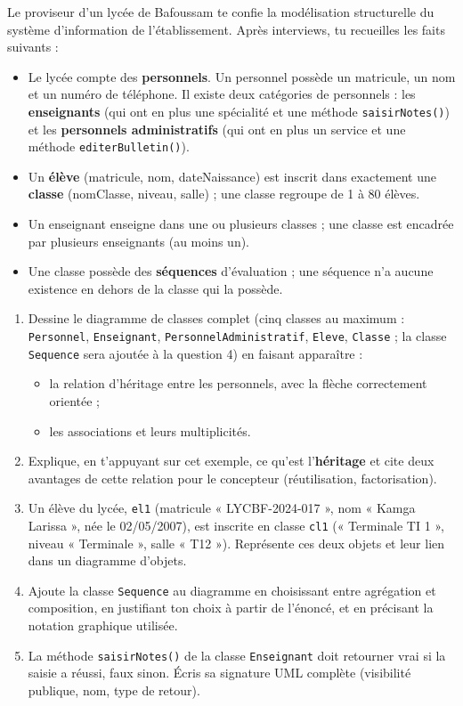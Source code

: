 \documentclass[11pt]{article}
\begin{document}
\begin{exercice}
Le proviseur d'un lycée de Bafoussam te confie la modélisation structurelle du système d'information de l'établissement. Après interviews, tu recueilles les faits suivants :
\begin{itemize}
  \item Le lycée compte des \textbf{personnels}. Un personnel possède un matricule, un nom et un numéro de téléphone. Il existe deux catégories de personnels : les \textbf{enseignants} (qui ont en plus une spécialité et une méthode \texttt{saisirNotes()}) et les \textbf{personnels administratifs} (qui ont en plus un service et une méthode \texttt{editerBulletin()}).
  \item Un \textbf{élève} (matricule, nom, dateNaissance) est inscrit dans exactement une \textbf{classe} (nomClasse, niveau, salle) ; une classe regroupe de 1 à 80 élèves.
  \item Un enseignant enseigne dans une ou plusieurs classes ; une classe est encadrée par plusieurs enseignants (au moins un).
  \item Une classe possède des \textbf{séquences} d'évaluation ; une séquence n'a aucune existence en dehors de la classe qui la possède.
\end{itemize}
\begin{enumerate}
  \item Dessine le diagramme de classes complet (cinq classes au maximum : \texttt{Personnel}, \texttt{Enseignant}, \texttt{PersonnelAdministratif}, \texttt{Eleve}, \texttt{Classe} ; la classe \texttt{Sequence} sera ajoutée à la question 4) en faisant apparaître :
  \begin{itemize}
    \item la relation d'héritage entre les personnels, avec la flèche correctement orientée ;
    \item les associations et leurs multiplicités.
  \end{itemize}
  \item Explique, en t'appuyant sur cet exemple, ce qu'est l'\textbf{héritage} et cite deux avantages de cette relation pour le concepteur (réutilisation, factorisation).
  \item Un élève du lycée, \texttt{el1} (matricule « LYCBF-2024-017 », nom « Kamga Larissa », née le 02/05/2007), est inscrite en classe \texttt{cl1} (« Terminale TI 1 », niveau « Terminale », salle « T12 »). Représente ces deux objets et leur lien dans un diagramme d'objets.
  \item Ajoute la classe \texttt{Sequence} au diagramme en choisissant entre agrégation et composition, en justifiant ton choix à partir de l'énoncé, et en précisant la notation graphique utilisée.
  \item La méthode \texttt{saisirNotes()} de la classe \texttt{Enseignant} doit retourner vrai si la saisie a réussi, faux sinon. Écris sa signature UML complète (visibilité publique, nom, type de retour).
\end{enumerate}
\end{exercice}
\end{document}
